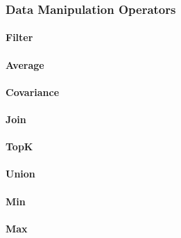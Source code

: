 		\subsubsection*{Data Manipulation Operators}
		\label{sec:data-op}				
			\paragraph{Filter}
			\paragraph{Average}
			\paragraph{Covariance}
			\paragraph{Join}
			\paragraph{TopK}
			\paragraph{Union}
			\paragraph{Min}
			\paragraph{Max}